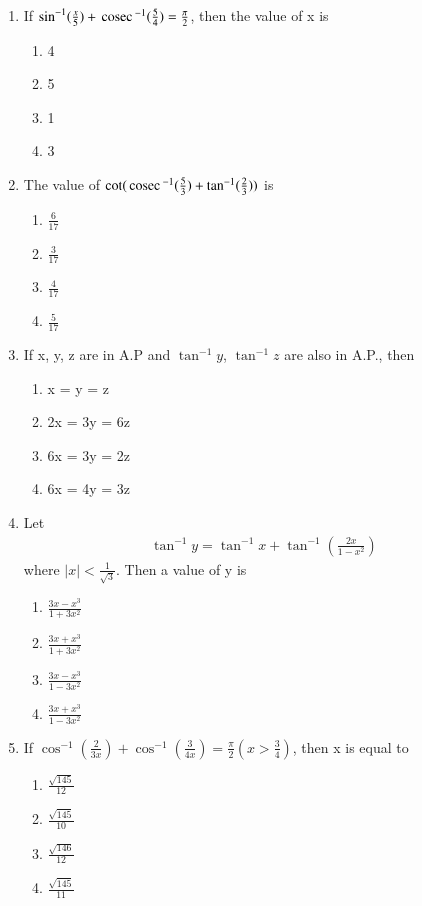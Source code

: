 \begin{enumerate}[label=\arabic*.,ref=\thesubsection.\theenumi]
\item If $\sin^{-1}(\frac{x}{5}) + \,\text{cosec}\,^{-1}(\frac{5}{4}) = \frac{\pi}{2}$, then the value of x is
\begin{enumerate}
\item 4
\item 5
\item 1
\item 3
\end{enumerate}

\item The value of $\cot(\,\text{cosec}\,^{-1}(\frac{5}{3}) + \tan^{-1}(\frac{2}{3}))$ is
\begin{enumerate}
\item $\frac{6}{17}$
\item $\frac{3}{17}$
\item $\frac{4}{17}$
\item $\frac{5}{17}$
\end{enumerate}

\item If x, y, z are in A.P and $\tan^{-1}y$, $\tan^{-1}z$ are also in A.P., then
\begin{enumerate}
\item x = y = z
\item 2x = 3y = 6z
\item 6x = 3y = 2z
\item 6x = 4y = 3z
\end{enumerate}

\item Let 
\begin{align*}
\tan^{-1}y = \tan^{-1}x + \tan^{-1}(\frac{2x}{1 - x^2})
\end{align*}
where $|x| < \frac{1}{\sqrt{3}}$. Then a value of y is
\begin{enumerate}
\item $\frac{3x - x^3}{1 + 3x^2}$
\item $\frac{3x + x^3}{1 + 3x^2}$
\item $\frac{3x - x^3}{1 - 3x^2}$
\item $\frac{3x + x^3}{1 - 3x^2}$
\end{enumerate}

\item If $\cos^{-1}(\frac{2}{3x}) + \cos^{-1}(\frac{3}{4x}) = \frac{\pi}{2}(x > \frac{3}{4})$, then x is equal to
\begin{enumerate}
\item $\frac{\sqrt{145}}{12}$
\item $\frac{\sqrt{145}}{10}$
\item $\frac{\sqrt{146}}{12}$
\item $\frac{\sqrt{145}}{11}$
\end{enumerate}


\end{enumerate}
